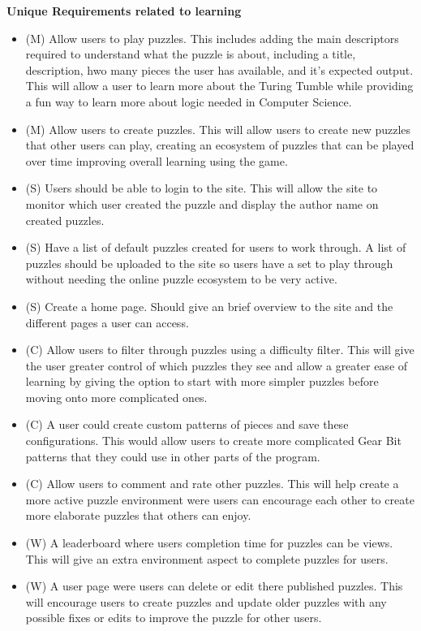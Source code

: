 \documentclass{l4proj}
\begin{document}
\textbf{Unique Requirements related to learning}
\begin{itemize}
    \item (M) Allow users to play puzzles. This includes adding the main descriptors required to understand what the puzzle is about, including a title, description, hwo many pieces the user has available, and it's expected output. This will allow a user to learn more about the Turing Tumble while providing a fun way to learn more about logic needed in Computer Science.
    \item (M) Allow users to create puzzles. This will allow users to create new puzzles that other users can play, creating an ecosystem of puzzles that can be played over time improving overall learning using the game.
    \item (S) Users should be able to login to the site. This will allow the site to monitor which user created the puzzle and display the author name on created puzzles.
    \item (S) Have a list of default puzzles created for users to work through. A list of puzzles should be uploaded to the site so users have a set to play through without needing the online puzzle ecosystem to be very active.
    \item (S) Create a home page. Should give an brief overview to the site and the different pages a user can access.
    \item (C) Allow users to filter through puzzles using a difficulty filter. This will give the user greater control of which puzzles they see and allow a greater ease of learning by giving the option to start with more simpler puzzles before moving onto more complicated ones.
    \item (C) A user could create custom patterns of pieces and save these configurations. This would allow users to create more complicated Gear Bit patterns that they could use in other parts of the program.
    \item (C) Allow users to comment and rate other puzzles. This will help create a more active puzzle environment were users can encourage each other to create more elaborate puzzles that others can enjoy.
    \item (W) A leaderboard where users completion time for puzzles can be views. This will give an extra environment aspect to complete puzzles for users.
    \item (W) A user page were users can delete or edit there published puzzles. This will encourage users to create puzzles and update older puzzles with any possible fixes or edits to improve the puzzle for other users.
\end{itemize}
\end{document}
